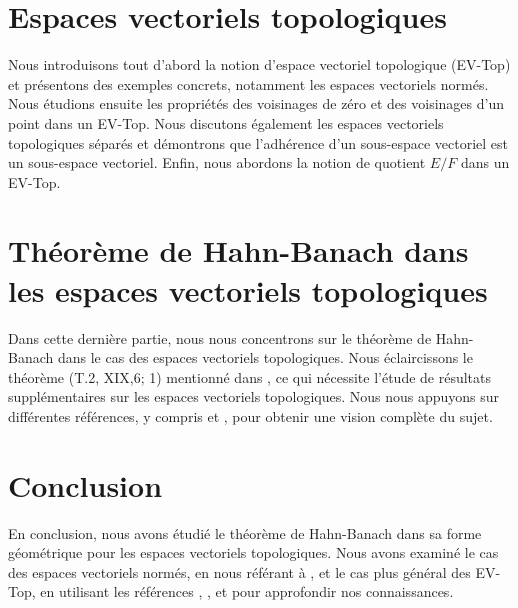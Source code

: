 \documentclass{article}
\begin{document}
    
\section{Espaces vectoriels topologiques}

Nous introduisons tout d'abord la notion d'espace vectoriel topologique 
(EV-Top) et présentons des exemples concrets, notamment les espaces 
vectoriels normés. Nous étudions ensuite les propriétés des voisinages 
de zéro et des voisinages d'un point dans un EV-Top. Nous discutons 
également les espaces vectoriels topologiques séparés et démontrons que 
l'adhérence d'un sous-espace vectoriel est un sous-espace vectoriel. 
Enfin, nous abordons la notion de quotient $E/F$ dans un EV-Top.

\section{Théorème de Hahn-Banach dans les espaces vectoriels topologiques}

Dans cette dernière partie, nous nous concentrons sur le théorème de 
Hahn-Banach dans le cas des espaces vectoriels topologiques. Nous 
éclaircissons le théorème (T.2, XIX,6; 1) mentionné dans 
\cite{schwartz1970topologie}, ce qui nécessite l'étude de résultats 
supplémentaires sur les espaces vectoriels topologiques. Nous nous 
appuyons sur différentes références, y compris \cite{nier2002introduction} 
et \cite{dixmier1981topologie}, pour obtenir une vision complète du sujet.

\section{Conclusion}

En conclusion, nous avons étudié le théorème de Hahn-Banach dans sa 
forme géométrique pour les espaces vectoriels topologiques. Nous avons 
examiné le cas des espaces vectoriels normés, en nous référant à 
\cite{brezis1983analyse}, et le cas plus général des EV-Top, en 
utilisant les références \cite{schwartz1970topologie}, 
\cite{nier2002introduction}, et \cite{dixmier1981topologie} pour 
approfondir nos connaissances.



\end{document}
